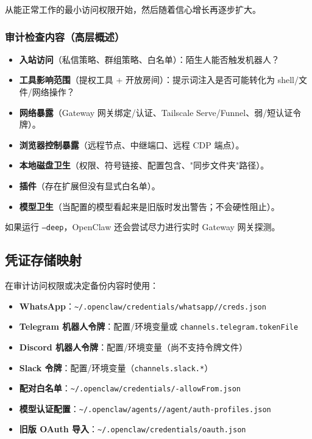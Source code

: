 从能正常工作的最小访问权限开始，然后随着信心增长再逐步扩大。

\subsubsection{审计检查内容（高层概述）}


\begin{itemize}
  \item \textbf{入站访问}（私信策略、群组策略、白名单）：陌生人能否触发机器人？
  \item \textbf{工具影响范围}（提权工具 + 开放房间）：提示词注入是否可能转化为 shell/文件/网络操作？
  \item \textbf{网络暴露}（Gateway 网关绑定/认证、Tailscale Serve/Funnel、弱/短认证令牌）。
  \item \textbf{浏览器控制暴露}（远程节点、中继端口、远程 CDP 端点）。
  \item \textbf{本地磁盘卫生}（权限、符号链接、配置包含、"同步文件夹"路径）。
  \item \textbf{插件}（存在扩展但没有显式白名单）。
  \item \textbf{模型卫生}（当配置的模型看起来是旧版时发出警告；不会硬性阻止）。
\end{itemize}


如果运行 \texttt{--deep}，OpenClaw 还会尝试尽力进行实时 Gateway 网关探测。

\subsection{凭证存储映射}


在审计访问权限或决定备份内容时使用：

\begin{itemize}
  \item \textbf{WhatsApp}：\texttt{\textasciitilde{}/.openclaw/credentials/whatsapp//creds.json}
  \item \textbf{Telegram 机器人令牌}：配置/环境变量或 \texttt{channels.telegram.tokenFile}
  \item \textbf{Discord 机器人令牌}：配置/环境变量（尚不支持令牌文件）
  \item \textbf{Slack 令牌}：配置/环境变量（\texttt{channels.slack.*}）
  \item \textbf{配对白名单}：\texttt{\textasciitilde{}/.openclaw/credentials/-allowFrom.json}
  \item \textbf{模型认证配置}：\texttt{\textasciitilde{}/.openclaw/agents//agent/auth-profiles.json}
  \item \textbf{旧版 OAuth 导入}：\texttt{\textasciitilde{}/.openclaw/credentials/oauth.json}
\end{itemize}


